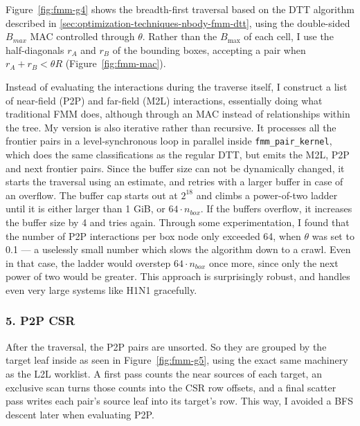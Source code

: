 Figure~\ref{fig:fmm-g4} shows the breadth-first traversal based on the DTT \cite{yokota2013dualtree} algorithm described in \ref{sec:optimization-techniques-nbody-fmm-dtt}, using the double-sided $B_{max}$ MAC controlled through $\theta$.
Rather than the $B_{\max}$ of each cell, I use the half-diagonals $r_A$ and $r_B$ of the bounding boxes, accepting a pair when $r_A + r_B < \theta R$
(Figure~\ref{fig:fmm-mac}).

Instead of evaluating the interactions during the traverse itself, I construct a list of near-field (P2P) and far-field (M2L) interactions, essentially doing what traditional FMM does, although through an MAC instead of relationships within the tree.
My version is also iterative rather than recursive.
It processes all the frontier pairs in a level-synchronous loop in parallel inside \texttt{fmm\_pair\_kernel}, which does the same classifications as the regular DTT, but emits the M2L, P2P and next frontier pairs.
Since the buffer size can not be dynamically changed, it starts the traversal using an estimate, and retries with a larger buffer in case of an overflow.
The buffer cap starts out at $2^18$ and climbs a power-of-two ladder until it is either larger than 1 GiB, or $64 \cdot n_{box}$.
If the buffers overflow, it increases the buffer size by 4 and tries again.
Through some experimentation, I found that the number of P2P interactions per box node only exceeded 64, when $\theta$ was set to 0.1 --- a uselessly small number which slows the algorithm down to a crawl.
Even in that case, the ladder would overstep $64 \cdot n_{box}$ once more, since only the next power of two would be greater.
This approach is surprisingly robust, and handles even very large systems like H1N1 gracefully.



\subsubsection{5. P2P CSR}

After the traversal, the P2P pairs are unsorted.
So they are grouped by the target leaf inside  as seen in Figure~\ref{fig:fmm-g5}, using the exact same machinery as the L2L worklist.
A first pass counts the near sources of each target, an exclusive scan turns those counts into the CSR row offsets, and a final scatter pass writes each pair's source leaf into its target's row. 
This way, I avoided a BFS descent later when evaluating P2P.

